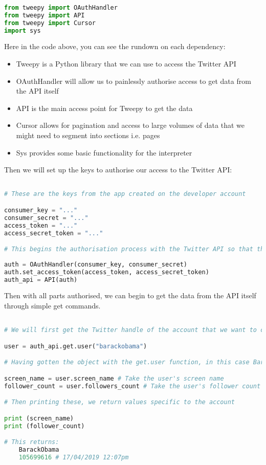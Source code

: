 \documentclass[12pt, letterpaper]{article}
\begin{document}
\begin{lstlisting}[language=python]
		
from tweepy import OAuthHandler
from tweepy import API
from tweepy import Cursor
import sys
\end{lstlisting}


Here in the code above, you can see the rundown on each dependency:
\begin{itemize}
	\item Tweepy is a Python library that we can use to access the Twitter API
	\item OAuthHandler will allow us to painlessly authorise access to get data from the API itself
	\item API is the main access point for Tweepy to get the data
	\item Cursor allows for pagination and access to large volumes of data that we might need to segment into sections i.e. pages
	\item Sys provides some basic functionality for the interpreter
\end{itemize}

Then we will set up the keys to authorise our access to the Twitter API:
	
\begin{lstlisting}[language=python]

# These are the keys from the app created on the developer account

consumer_key = "..." 
consumer_secret = "..."
access_token = "..."
access_secret_token = "..."

# This begins the authorisation process with the Twitter API so that the program can authenticate it self with the website
	
auth = OAuthHandler(consumer_key, consumer_secret)
auth.set_access_token(access_token, access_secret_token)
auth_api = API(auth)
\end{lstlisting}

Then with all parts authorised, we can begin to get the data from the API itself through simple get commands.

\begin{lstlisting}[language=python]

# We will first get the Twitter handle of the account that we want to check out:

user = auth_api.get.user("barackobama")

# Having gotten the object with the get.user function, in this case Barack Obama's account, we can execute some functions on it like:

screen_name = user.screen_name # Take the user's screen name
follower_count = user.followers_count # Take the user's follower count

# Then printing these, we return values specific to the account

print (screen_name)
print (follower_count)

# This returns:
	BarackObama
	105699616 # 17/04/2019 12:07pm

\end{lstlisting}
\end{document}
